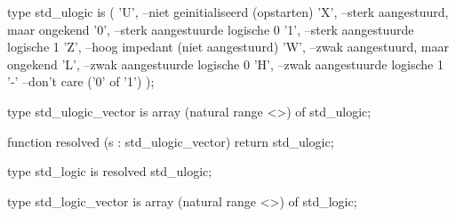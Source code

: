 type std_ulogic is (
    'U',  --niet geinitialiseerd (opstarten)
    'X',  --sterk aangestuurd, maar ongekend
    '0',  --sterk aangestuurde logische 0
    '1',  --sterk aangestuurde logische 1
    'Z',  --hoog impedant (niet aangestuurd)
    'W',  --zwak aangestuurd, maar ongekend
    'L',  --zwak aangestuurde logische 0
    'H',  --zwak aangestuurde logische 1
    '-'   --don't care ('0' of '1')
);

type std_ulogic_vector is array (natural range <>) of std_ulogic;

function resolved (s : std_ulogic_vector) return std_ulogic;

type std_logic is resolved std_ulogic;

type std_logic_vector is array (natural range <>) of std_logic;